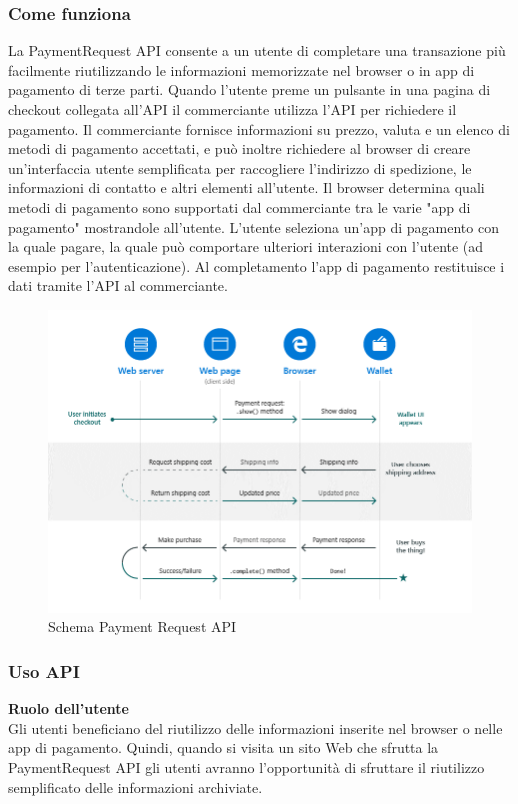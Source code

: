 \documentclass[11pt ,a4paper , twoside , openright ]{article}
\begin{document}
\subsubsection{Come funziona}	
La PaymentRequest API consente a un utente di completare una transazione più facilmente riutilizzando le informazioni memorizzate nel browser o in app di pagamento di terze parti.
Quando l'utente preme un pulsante in una pagina di checkout collegata all'API il commerciante utilizza l'API per richiedere il pagamento. Il commerciante fornisce informazioni su prezzo, valuta e un elenco di metodi di pagamento accettati, e può inoltre richiedere al browser di creare un'interfaccia utente semplificata per raccogliere l'indirizzo di spedizione, le informazioni di contatto e altri elementi all'utente.
Il browser determina quali metodi di pagamento sono supportati dal commerciante tra le varie "app di pagamento" mostrandole all'utente. 
L'utente seleziona un'app di pagamento con la quale pagare, la quale può comportare ulteriori interazioni con l'utente (ad esempio per l'autenticazione). 
Al completamento l'app di pagamento restituisce i dati tramite l'API al commerciante.

\begin{figure}[h]
	\centering
	\includegraphics[width=1\linewidth]{SchemaPayment}
	\caption{Schema Payment Request API}
	\label{fig:Schema Payment}
\end{figure}
\pagebreak

\subsubsection{Uso API}
\textbf{Ruolo dell'utente}
\\
Gli utenti beneficiano del riutilizzo delle informazioni inserite nel browser o nelle app di pagamento. Quindi, quando si visita un sito Web che sfrutta la PaymentRequest API gli utenti avranno l'opportunità di sfruttare il riutilizzo semplificato delle informazioni archiviate.
\end{document}

